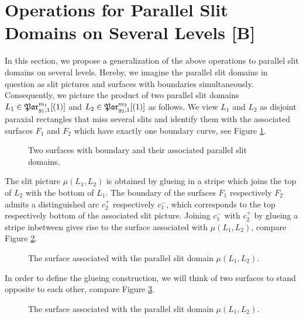 \section{Operations for Parallel Slit Domains on Several Levels [B]}
\label{homology_operations:glueing_construction}
In this section, we propose a generalization of the above operations to parallel slit domains on several levels.
Hereby, we imagine the parallel slit domains in question as slit pictures and surfaces with boundaries simultaneously.
Consequently, we picture the product of two parallel slit domains $L_1 \in \mathfrak{Par}_{g_1,1}^{m_1}[(1)]$ and $L_2 \in \mathfrak{Par}_{g_2,1}^{m_2}[(1)]$ as follows.
We view $L_1$ and $L_2$ as disjoint paraxial rectangles that miss several slits and identify them with the associated surfaces $F_1$ and $F_2$ which have exactly one boundary curve,
see Figure \ref{homology_operations:parallel_patching_slit_pics:general_glueing_two_slit_pics_and_surfaces}.
\begin{figure}[ht]
    \centering
    \def\svgwidth{.7\columnwidth}
    
    \caption{\label{homology_operations:parallel_patching_slit_pics:general_glueing_two_slit_pics_and_surfaces}Two surfaces with boundary and their associated parallel slit domains.}
\end{figure}

The slit picture $\mu(L_1, L_2)$ is obtained by glueing in a stripe which joins the top of $L_2$ with the bottom of $L_1$.
\label{page:glueing_construction_arcs_c_plus_and_c_minus}%
The boundary of the surfaces $F_1$ respectively $F_2$ admits a distinguished arc $c_2^+$ respectively $c_1^-$,
which corresponds to the top respectively bottom of the associated slit picture.
Joining $c_1^-$ with $c_2^+$ by glueing a stripe inbetween gives rise to the surface associated with $\mu(L_1, L_2)$,
compare Figure \ref{homology_operations:parallel_patching_slit_pics:general_glueing_two_slit_pics_and_surfaces_glued}.
\begin{figure}[ht]
    \centering
    \def\svgwidth{.8\columnwidth}
    
    \caption{\label{homology_operations:parallel_patching_slit_pics:general_glueing_two_slit_pics_and_surfaces_glued}The surface associated with the parallel slit domain $\mu(L_1, L_2)$.}
\end{figure}
In order to define the glueing construction, we will think of two surfaces to stand opposite to each other,
compare Figure \ref{homology_operations:parallel_patching_slit_pics:general_glueing_two_surfaces_glued_untwisted}.
\begin{figure}[ht]
    \centering
    \def\svgwidth{.8\columnwidth}
    
    \caption{\label{homology_operations:parallel_patching_slit_pics:general_glueing_two_surfaces_glued_untwisted}The surface associated with the parallel slit domain $\mu(L_1, L_2)$.}
\end{figure}

